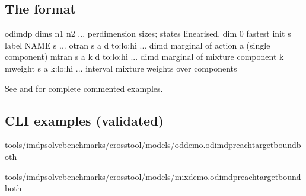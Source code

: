 \documentclass[a4paper,10pt,english]{sphinxmanual}
\begin{document}
\subsection{The  format}
\label{\detokenize{manual/odimdp:the-odimdp-format}}
\begin{sphinxVerbatim}[commandchars=\\\{\}]
odimdp
dims n1 n2 ...                        \PYGZsh{} per\PYGZhy{}dimension sizes; states linearised, dim 0 fastest
init s
label NAME s ...
otran  \PYGZlt{}s\PYGZgt{} \PYGZlt{}a\PYGZgt{} \PYGZlt{}d\PYGZgt{} to:lo:hi ...       \PYGZsh{} dim\PYGZhy{}d marginal of action a (single component)
mtran  \PYGZlt{}s\PYGZgt{} \PYGZlt{}a\PYGZgt{} \PYGZlt{}k\PYGZgt{} \PYGZlt{}d\PYGZgt{} to:lo:hi ...   \PYGZsh{} dim\PYGZhy{}d marginal of mixture component k
mweight \PYGZlt{}s\PYGZgt{} \PYGZlt{}a\PYGZgt{} k:lo:hi ...           \PYGZsh{} interval mixture weights over components
\end{sphinxVerbatim}

\sphinxAtStartPar
See  and  for complete
commented examples.


\subsection{CLI examples (validated)}
\label{\detokenize{manual/odimdp:cli-examples-validated}}
\begin{sphinxVerbatim}[commandchars=\\\{\}]
tools/imdp\PYGZus{}solvebenchmarks/crosstool/models/od\PYGZus{}demo.odimdpreachtarget\PYGZhy{}\PYGZhy{}boundboth

tools/imdp\PYGZus{}solvebenchmarks/crosstool/models/mix\PYGZus{}demo.odimdpreachtarget\PYGZhy{}\PYGZhy{}boundboth
\end{sphinxVerbatim}
\end{document}
